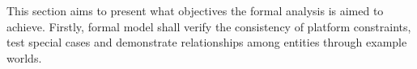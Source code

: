 This section aims to present what objectives the formal analysis is aimed to achieve. Firstly, formal model shall verify the consistency of platform constraints, test special cases and demonstrate relationships among entities through example worlds. \\







